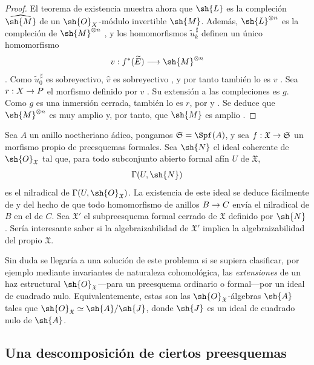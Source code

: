 \documentclass[oneside]{amsart}
\makeatletter
\newcommand{\ega@arrow}[2]{\mathchoice{#1}{#2}{#2}{#2}}
\renewcommand{\to}{\ega@arrow{\longrightarrow}{\rightarrow}}
\newcommand{\oldpage}[2][]{{\marginnote{\normalfont\textbf{#1}~|~#2}}\ignorespaces}
\let\EGAOriginalLabel\label
\renewcommand{\label}[1]{\phantomsection\EGAOriginalLabel{#1}}
\makeatother
\begin{document}
\begin{proof}
El teorema de existencia  muestra ahora que $\sh{L}$ es
la compleción $\widehat{\sh{M}}$ de un
$\sh{O}_X$-módulo invertible $\sh{M}$. Además,
$\sh{L}^{\otimes n}$ es la compleción de
$\sh{M}^{\otimes n}$ , y los homomorfismos
$\widetilde{u}_k^{\,\sharp}$ definen un único homomorfismo
\[
  v:f^*(\widetilde{E})
  \longrightarrow
  \sh{M}^{\otimes n}
\]
. Como
$\widetilde{u}_0^{\,\sharp}$ es sobreyectivo,
$\widehat{v}$ es sobreyectivo , y por tanto también
lo es $v$ . Sea $r:X\to P$ el morfismo definido
por $v$ . Su extensión a las compleciones es
$g$. Como $g$ es una inmersión cerrada, también lo es $r$, por
 y . Se deduce que
$\sh{M}^{\otimes n}$ es muy amplio  y, por tanto,
que $\sh{M}$ es amplio .
\end{proof}

\begin{remark}[5.4.6]
\label{III.5.4.6}
Sea $A$ un anillo noetheriano ádico, pongamos
$\mathfrak{S}=\Spf(A)$, y sea
$f:\mathfrak{X}\to\mathfrak{S}$ un morfismo propio de preesquemas
formales. Sea $\sh{N}$ el ideal coherente de
$\sh{O}_{\mathfrak{X}}$ tal que, para todo subconjunto abierto
formal afín $U$ de $\mathfrak{X}$,
\[
  \Gamma(U,\sh{N})
\]
es el nilradical de
$\Gamma(U,\sh{O}_{\mathfrak{X}})$. La existencia de este ideal
se deduce fácilmente de  y del hecho de que
todo homomorfismo de anillos $B\to C$ envía el nilradical de $B$ en
el de $C$. Sea $\mathfrak{X}'$ el subpreesquema formal cerrado de
$\mathfrak{X}$ definido por $\sh{N}$
. Sería interesante saber si la
algebraizabilidad de $\mathfrak{X}'$ implica la algebraizabilidad del
propio $\mathfrak{X}$.

Sin duda se llegaría a una solución de este problema si se supiera
clasificar, por ejemplo mediante invariantes
\oldpage[III]{159}
de naturaleza cohomológica, las \emph{extensiones} de un haz estructural
$\sh{O}_{\mathfrak{X}}$---para un preesquema ordinario o
formal---por un ideal de cuadrado nulo. Equivalentemente, estas son las
$\sh{O}_{\mathfrak{X}}$-álgebras $\sh{A}$ tales que
$\sh{O}_{\mathfrak{X}}\simeq\sh{A}/\sh{J}$, donde $\sh{J}$ es un
ideal de cuadrado nulo de $\sh{A}$.
\end{remark}


\subsection{Una descomposición de ciertos preesquemas}
\label{subsection:III.5.5}
\end{document}
